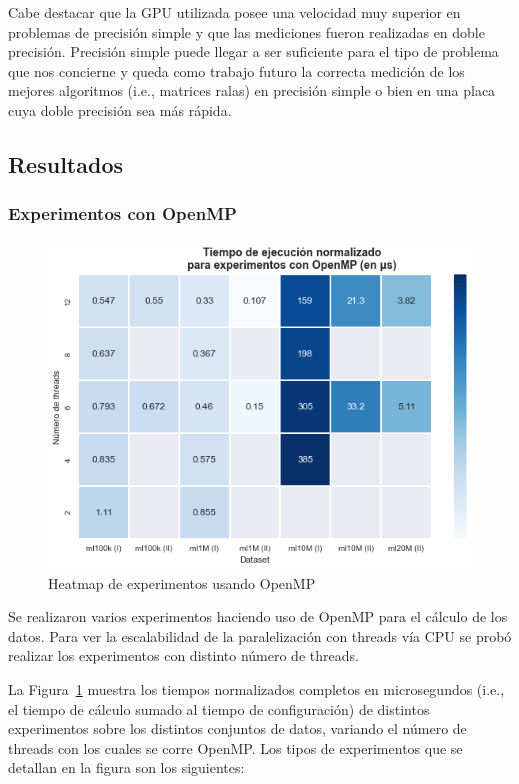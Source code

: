 \documentclass[11pt, a4paper]{article}
\begin{document}
  Cabe destacar que la GPU utilizada posee una velocidad muy superior en
  problemas de precisión simple y que las mediciones fueron realizadas en doble
  precisión. Precisión simple puede llegar a ser suficiente para el tipo de
  problema que nos concierne y queda como trabajo futuro la correcta medición
  de los mejores algoritmos (i.e., matrices ralas) en precisión simple o bien
  en una placa cuya doble precisión sea más rápida.
 
  \subsection{Resultados}

  \subsubsection{Experimentos con OpenMP}

  \begin{figure}[ht]
    \centering
    \includegraphics[width=\textwidth]{plots/heatmap_openmp.png}
      \caption{Heatmap de experimentos usando OpenMP}\label{fig:heatmap:omp}
  \end{figure}
 
  Se realizaron varios experimentos haciendo uso de OpenMP para el cálculo de
  los datos. Para ver la escalabilidad de la paralelización con threads vía
  CPU se probó realizar los experimentos con distinto número de threads.

  La Figura~\ref{fig:heatmap:omp} muestra los tiempos normalizados completos en
  microsegundos (i.e., el tiempo de cálculo sumado al tiempo de configuración)
  de distintos experimentos sobre los distintos conjuntos de datos, variando el
  número de threads con los cuales se corre OpenMP. Los tipos de experimentos
  que se detallan en la figura son los siguientes:
\end{document}
